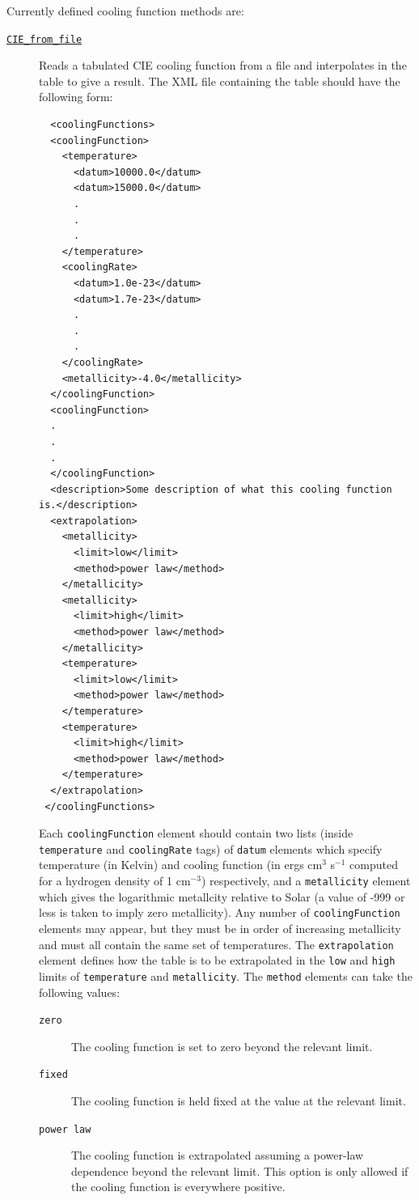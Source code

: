 Currently defined cooling function methods are:
\begin{description}
 \item [\hyperlink{cooling.cooling_function.CIE_file.F90:cooling_functions_cie_file:cooling_function_cie_file}{{\tt CIE\_from\_file}}] Reads a tabulated CIE cooling function from a file and interpolates in the table to give a result. The XML file containing the table should have the following form:
 \begin{verbatim}
  <coolingFunctions>
  <coolingFunction>
    <temperature>
      <datum>10000.0</datum>
      <datum>15000.0</datum>
      .
      .
      .
    </temperature>
    <coolingRate>
      <datum>1.0e-23</datum>
      <datum>1.7e-23</datum>
      .
      .
      .
    </coolingRate>
    <metallicity>-4.0</metallicity>
  </coolingFunction>
  <coolingFunction>
  .
  .
  .
  </coolingFunction>
  <description>Some description of what this cooling function is.</description>
  <extrapolation>
    <metallicity>
      <limit>low</limit>
      <method>power law</method>
    </metallicity>
    <metallicity>
      <limit>high</limit>
      <method>power law</method>
    </metallicity>
    <temperature>
      <limit>low</limit>
      <method>power law</method>
    </temperature>
    <temperature>
      <limit>high</limit>
      <method>power law</method>
    </temperature>
  </extrapolation>
 </coolingFunctions>
 \end{verbatim}
 Each {\tt coolingFunction} element should contain two lists (inside {\tt temperature} and {\tt coolingRate} tags) of {\tt datum} elements which specify temperature (in Kelvin) and cooling function (in ergs cm$^3$ s$^{-1}$ computed for a hydrogen density of 1 cm$^{-3}$) respectively, and a {\tt metallicity} element which gives the logarithmic metallcity relative to Solar (a value of -999 or less is taken to imply zero metallicity). Any number of {\tt coolingFunction} elements may appear, but they must be in order of increasing metallicity and must all contain the same set of temperatures. The {\tt extrapolation} element defines how the table is to be extrapolated in the {\tt low} and {\tt high} limits of {\tt temperature} and {\tt metallicity}. The {\tt method} elements can take the following values:
 \begin{description}
  \item[{\tt zero}] The cooling function is set to zero beyond the relevant limit.
  \item[{\tt fixed}] The cooling function is held fixed at the value at the relevant limit.
  \item[{\tt power law}] The cooling function is extrapolated assuming a power-law dependence beyond the relevant limit. This option is only allowed if the cooling function is everywhere positive.

\end{description}
\end{description}
